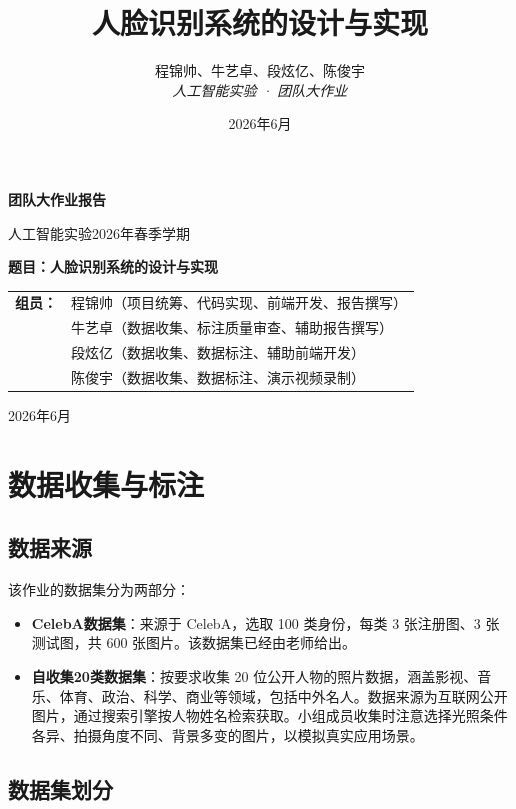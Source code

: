 \documentclass[12pt, a4paper]{article}
\title{\textbf{人脸识别系统的设计与实现}}
\author{
  程锦帅、牛艺卓、段炫亿、陈俊宇 \\
  \textit{人工智能实验 · 团队大作业}
}
\date{2026年6月}
\begin{document}
\begin{titlepage}
\centering
\vspace*{3cm}
{\Huge\bfseries 团队大作业报告\par}
{\Large 人工智能实验2026年春季学期\par}
\vspace{1.5cm}
{\Huge\bfseries 题目：人脸识别系统的设计与实现\par}
\vspace{2cm}
{\large
\begin{tabular}{rl}
\textbf{组员：} & 程锦帅（项目统筹、代码实现、前端开发、报告撰写） \\
               & 牛艺卓（数据收集、标注质量审查、辅助报告撰写） \\
               & 段炫亿（数据收集、数据标注、辅助前端开发） \\
               & 陈俊宇（数据收集、数据标注、演示视频录制） \\
\end{tabular}
}
\vfill
{\large 2026年6月\par}
\end{titlepage}


\newpage

\section{数据收集与标注}

\subsection{数据来源}

该作业的数据集分为两部分：

\begin{itemize}
  \item \textbf{CelebA数据集}：来源于 CelebA，选取 100 类身份，每类 3 张注册图、3 张测试图，共 600 张图片。该数据集已经由老师给出。
  \item \textbf{自收集20类数据集}：按要求收集 20 位公开人物的照片数据，涵盖影视、音乐、体育、政治、科学、商业等领域，包括中外名人。数据来源为互联网公开图片，通过搜索引擎按人物姓名检索获取。小组成员收集时注意选择光照条件各异、拍摄角度不同、背景多变的图片，以模拟真实应用场景。
\end{itemize}

\subsection{数据集划分}
\end{document}
